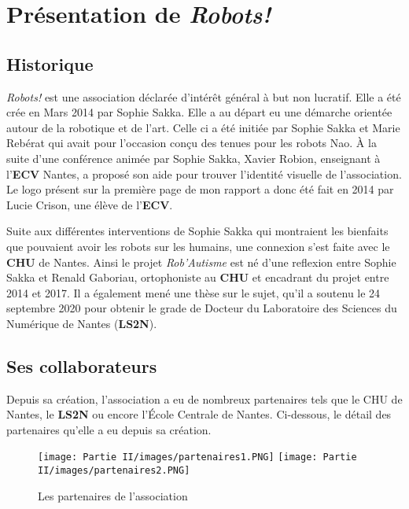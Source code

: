 \section{Présentation de \textit{Robots!}}

\subsection{Historique}
\textit{Robots!} \cite{noauthor_association_nodate} est une association déclarée d'intérêt général à but non lucratif. Elle a été crée en Mars 2014 par Sophie Sakka. Elle a au départ eu une démarche orientée autour de la robotique et de l'art. Celle ci a été initiée par Sophie Sakka et Marie Rebérat qui avait pour l'occasion conçu des tenues pour les robots Nao. \`A la suite d'une conférence animée par Sophie Sakka, Xavier Robion, enseignant à l'\textbf{ECV} Nantes, a proposé son aide pour trouver l'identité visuelle de l'association. Le logo présent sur la première page de mon rapport a donc été fait en 2014 par Lucie Crison, une élève de l'\textbf{ECV}. 

\vspace{0.5cm}
Suite aux différentes interventions de Sophie Sakka qui montraient les bienfaits que pouvaient avoir les robots sur les humains, une connexion s'est faite avec le \textbf{CHU} de Nantes. Ainsi le projet \textit{Rob'Autisme} est né d'une reflexion entre Sophie Sakka et Renald Gaboriau, ortophoniste au \textbf{CHU} et encadrant du projet entre 2014 et 2017. Il a également mené une thèse sur le sujet, qu'il a soutenu le 24 septembre 2020 pour obtenir le grade de Docteur du Laboratoire des Sciences du Numérique de Nantes (\textbf{LS2N}).

\subsection{Ses collaborateurs}
Depuis sa création, l'association a eu de nombreux partenaires tels que le CHU de Nantes, le \textbf{LS2N} ou encore l'\'Ecole Centrale de Nantes. Ci-dessous, le détail des partenaires qu'elle a eu depuis sa création.

\begin{figure}[!h]
    \centering
    \texttt{[image: Partie II/images/partenaires1.PNG]}
    \texttt{[image: Partie II/images/partenaires2.PNG]}
    \caption[\, \, Partenaires]{Les partenaires de l'association}
    \label{fig_2.2.0.1}
\end{figure}

